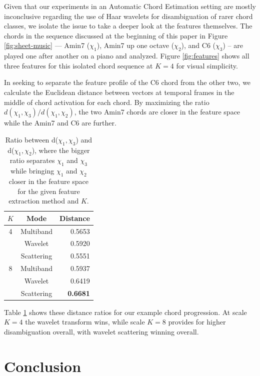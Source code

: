 \documentclass{article}
\begin{document}
Given that our experiments in an Automatic Chord Estimation setting are mostly inconclusive regarding the use of Haar wavelets for disambiguation of rarer chord classes, we isolate the issue to take a deeper look at the features themselves. The chords in the sequence discussed at the beginning of this paper in Figure \ref{fig:sheet-music} --- Amin7 ($\chi_1$), Amin7 up one octave ($\chi_2$), and C6 ($\chi_3$) --  are played one after another on a piano and analyzed. Figure \ref{fig:features} shows all three features for this isolated chord sequence at $K=4$ for visual simplicity. 

In seeking to separate the feature profile of the C6 chord from the other two, we calculate the Euclidean distance between vectors at temporal frames in the middle of chord activation for each chord. By maximizing the ratio $d(\chi_1,\chi_3)/d(\chi_1,\chi_2)$, the two Amin7 chords are closer in the feature space while the Amin7 and C6 are further.

\begin{table}
	\begin{center}
	\begin{tabular} {| c | c | r |}
	\hline
	$K$ & Mode & Distance \\
	\hline
	4 & Multiband & 0.5653 \\
	& Wavelet & 0.5920 \\
	& Scattering & 0.5551 \\
	\hline
	8 & Multiband & 0.5937 \\
	& Wavelet & 0.6419 \\
	& Scattering & \textbf{0.6681} \\

	\hline
	\end{tabular}
	\end{center}
	\protect\caption{Ratio between d($\chi_1,\chi_3$) and d($\chi_1,\chi_2$), where the bigger ratio separates $\chi_1$ and $\chi_3$ while bringing $\chi_1$ and $\chi_2$ closer in the feature space for the given feature extraction method and $K$.
	\label{table:distances}}
\end{table}

Table \ref{table:distances} shows these distance ratios for our example chord progression. At scale $K=4$ the wavelet transform wins, while scale $K=8$ provides for higher disambiguation overall, with wavelet scattering winning overall.

	

\section{Conclusion}\label{sec:conclusion}
\end{document}
